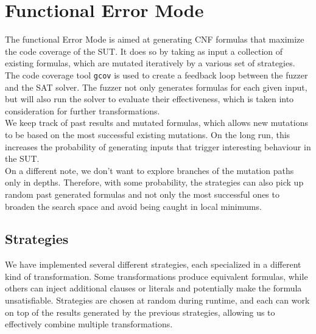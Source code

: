 \documentclass{article}
\begin{document}
\section{Functional Error Mode}

The functional Error Mode is aimed at generating CNF formulas that maximize the code coverage of the SUT. 
It does so by taking as input a collection of existing formulas, which are mutated iteratively by a 
various set of strategies.\\

The code coverage tool \verb|gcov| is used to create a feedback loop between the fuzzer and the SAT solver.
The fuzzer not only generates formulas for each given input, but will also run the solver to evaluate
their effectiveness, which is taken into consideration for further transformations.\\

We keep track of past results and mutated formulas, which allows new mutations to be based on the most successful existing mutations. On the long run, this increases the probability of generating inputs that trigger interesting behaviour in the SUT.\\

On a different note, we don't want to explore branches of the mutation paths only in depths. Therefore, with some probability, the strategies can also pick up random past generated formulas and not only the most successful ones to broaden the search space and avoid being caught in local minimums.

\subsection{Strategies}

We have implemented several different strategies, each specialized in a different kind of transformation.
Some transformations produce equivalent formulas, while others can inject additional clauses or literals
and potentially make the formula unsatisfiable.
Strategies are chosen at random during runtime, and each can work on top of the results generated by the
previous strategies, allowing us to effectively combine multiple transformations. 
\end{document}
